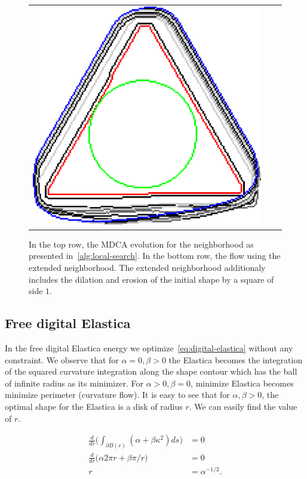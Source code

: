 \begin{figure}
\begin{tabular}{ccc}
\includegraphics[scale=0.25]{figures/chapter5/mdca-larger-neighborhood/triangle/0.01/0.25/summary.pdf}\\[2em]
\end{tabular}
\caption{In the top row, the MDCA evolution for the neighborhood as presented in~\cref{alg:local-search}. In the bottom row, the flow using the extended neighborhood. The extended neighborhood additionaly includes the dilation and erosion of the initial shape by a square of side $1$.}
\label{fig:mdca-larger-neighborhood}
\end{figure}


\subsection{Free digital Elastica}
\label{ch6:subsec:free-digital-elastica}
In the free digital Elastica energy we optimize~\cref{eq:digital-elastica} without any constraint. We observe that for $\alpha=0, \beta >0$ the Elastica becomes the integration of the squared curvature integration along the shape contour which has the ball of infinite radius as its minimizer. For $\alpha > 0, \beta=0$, minimize Elastica becomes minimize perimeter (curvature flow). It is easy to see that for $\alpha, \beta > 0$, the optimal shape for the Elastica is a disk of radius $r$. We can easily find the value of $r$.

\begin{align*}
	\frac{d}{dr}\big( \int_{\partial B(r)}{ (\alpha + \beta \kappa ^2) ds} \big ) &= 0\\
	\frac{d}{dr}\big( \alpha 2\pi r + \beta \pi/r \big) &= 0\\
	r &= \alpha^{-1/2}.
\end{align*}  

